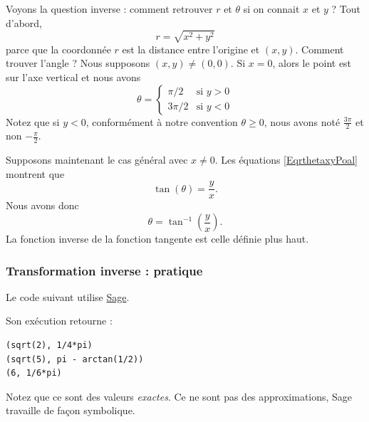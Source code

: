 Voyons la question inverse : comment retrouver \( r\) et \( \theta\) si on connait \( x\) et \( y\) ? Tout d'abord,
\begin{equation}
	r=\sqrt{x^2+y^2}
\end{equation}
parce que la coordonnée \( r\) est la distance entre l'origine et \( (x,y)\). Comment trouver l'angle ? Nous supposons \( (x,y)\neq (0,0)\). Si \( x=0\), alors le point est sur l'axe vertical et nous avons
\begin{equation}
	\theta=\begin{cases}
		\pi/2  & \text{si }y>0 \\
		3\pi/2 & \text{si }y<0
	\end{cases}
\end{equation}
Notez que si \( y<0\), conformément à notre convention \( \theta\geq 0\), nous avons noté \( \frac{ 3\pi }{2}\) et non \( -\frac{ \pi }{ 2 }\).

Supposons maintenant le cas général avec \( x\neq 0\). Les équations \eqref{EqrthetaxyPoal} montrent que
\begin{equation}
	\tan(\theta)=\frac{ y }{ x }.
\end{equation}
Nous avons donc
\begin{equation}
	\theta=\tan^{-1}\left( \frac{ y }{ x } \right).
\end{equation}
La fonction inverse de la fonction tangente est celle définie plus haut.

\subsubsection{Transformation inverse : pratique}

Le code suivant utilise \href{http://www.sagemath.org}{Sage}.



Son exécution retourne :
\begin{verbatim}
(sqrt(2), 1/4*pi)
(sqrt(5), pi - arctan(1/2))
(6, 1/6*pi)
\end{verbatim}
Notez que ce sont des valeurs \emph{exactes}. Ce ne sont pas des approximations, Sage travaille de façon symbolique.

